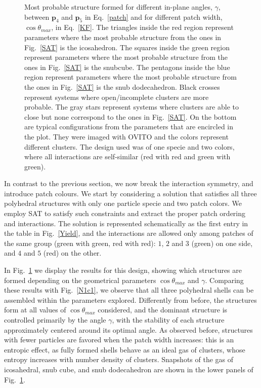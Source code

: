\documentclass[a4paper, amsfonts, amssymb, amsmath, reprint, showkeys, nofootinbib, oneside]{revtex4-1}
\begin{document}
\begin{figure}[t]
	\caption{\label{N1c2} Most probable structure formed for different in-plane angles, $\gamma$, between $\textbf{p}_4$ and $\textbf{p}_5$ in Eq.~\ref{patch} and for different patch width, $\cos\theta_{max}$, in Eq.~\ref{KF}. The triangles inside the red region represent parameters where the most probable structure from the ones in Fig.~\ref{SAT} is the icosahedron. The squares inside the green region represent parameters where the most probable structure from the ones in Fig.~\ref{SAT} is the snubcube. The pentagons inside the blue region represent parameters where the most probable structure from the ones in Fig.~\ref{SAT} is the snub dodecahedron. Black crosses represent systems where open/incomplete clusters are more probable. The gray stars represent systems where clusters are able to close but none correspond to the ones in Fig.~\ref{SAT}. On the bottom are typical configurations from the parameters that are encircled in the plot. They were imaged with OVITO and the colors represent different clusters. The design used was of one specie and two colors, where all interactions are self-similar (red with red and green with green).}
\end{figure}


In contrast to the previous section, we now break the interaction symmetry, and introduce patch colours.
We start by considering a solution that satisfies all three polyhedral structures with only one particle specie and two patch colors. We employ SAT to satisfy such constraints and extract the proper patch ordering and interactions.
The solution is represented schematically as the first entry in the table in Fig.~\ref{Yield}, and the interactions are allowed only among patches of the same group (green with green, red with red): $1$, $2$ and $3$ (green) on one side, and $4$ and $5$ (red) on the other.

In Fig.~\ref{N1c2} we display the results for this design, showing which structures are formed depending on the geometrical parameters $\cos\theta_{max}$ and $\gamma$. Comparing these results with Fig.~\ref{N1c1}, we observe that all three polyhedral shells can be assembled within the parameters explored. Differently from before, the structures form at all values of $\cos\theta_{max}$ considered, and the dominant structure is controlled primarily by the angle $\gamma$, with the stability of each structure approximately centered around its optimal angle. As observed before, structures with fewer particles are favored when the patch width increases: this is an entropic effect, as fully formed shells behave as an ideal gas of clusters, whose entropy increases with number density of clusters. Snapshots of the gas of icosahedral, snub cube, and snub dodecahedron are shown in the lower panels of Fig.~\ref{N1c2}.
\end{document}
